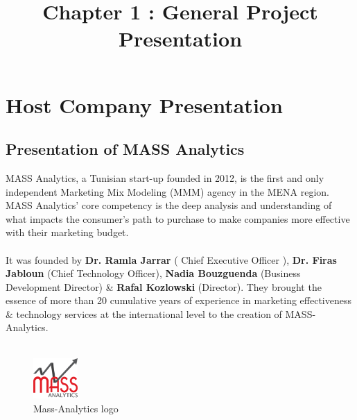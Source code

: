 \documentclass[12pt]{article}
\begin{document}
	\listoffigures
	\title{Chapter 1 : General Project Presentation}
	\maketitle

	\section{Host Company Presentation}
	
	\subsection{Presentation of MASS Analytics}
	MASS Analytics, a Tunisian start-up founded in 2012, is the first and only independent Marketing Mix Modeling (MMM) agency in the MENA region. MASS Analytics’ core competency is the deep analysis and understanding of what impacts the consumer's path to purchase to make companies more effective with their marketing budget.
	\\
	\\
	It was founded by \textbf{Dr. Ramla Jarrar } ( Chief Executive Officer ),  \textbf{Dr. Firas Jabloun } (Chief Technology Officer), \textbf{Nadia Bouzguenda} (Business Development Director) \& \textbf{Rafal Kozlowski} (Director). They brought the essence of more than 20 cumulative years of experience in marketing effectiveness \& technology services at the international level to the creation of MASS-Analytics. \cite{ref1}
	\\
	\\
	\begin{figure}[h]
	\centering
	\includegraphics[width=0.15\textwidth]{Mass_logo.png}
	\caption{Mass-Analytics logo}
    \end{figure}
\end{document}
